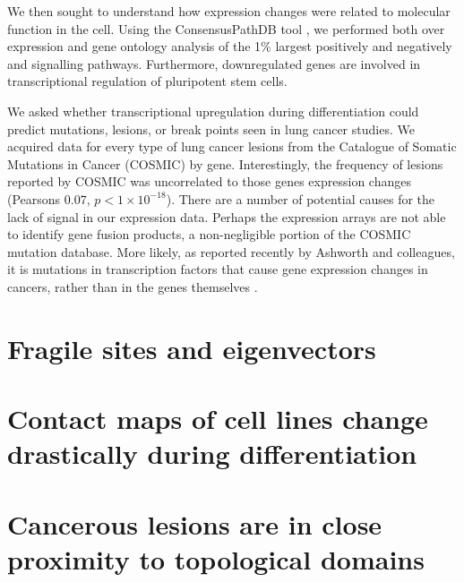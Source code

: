 We then sought to understand how expression changes were related to molecular function in the cell.  Using the ConsensusPathDB
tool \citep{kamburov2012}, we performed both over expression and gene ontology analysis of the 1\%  largest positively and negatively
and signalling pathways.  Furthermore, downregulated genes are involved in transcriptional regulation of pluripotent stem cells.

We asked whether transcriptional upregulation during differentiation could predict mutations, lesions, or break points seen in lung
cancer studies.  We acquired data for every type of lung cancer lesions from the Catalogue of Somatic Mutations in Cancer
(COSMIC) \citep{forbes2009} by gene.  Interestingly, the frequency of lesions reported by COSMIC was uncorrelated to those genes
expression changes (Pearsons $0.07$, $p < 1 \times 10^{-18}$).  There are a number of potential causes for the lack of signal in
our expression data.  Perhaps the expression arrays are not able to identify gene fusion products, a non-negligible portion of
the COSMIC mutation database.  More likely, as reported recently by Ashworth and colleagues, it is mutations in transcription factors
that cause gene expression changes in cancers, rather than in the genes themselves \citep{ashworth2014}.

\section*{Fragile sites and eigenvectors}



\section*{Contact maps of cell lines change drastically during differentiation}

\section*{Cancerous lesions are in close proximity to topological domains}
